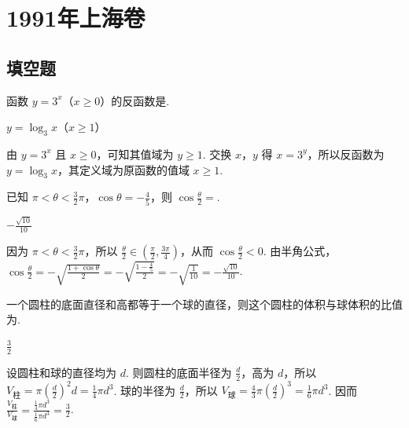 \documentclass[UTF8,a4paper,oneside,11pt]{ctexbook}
\begin{document}
\mainmatter

\chapter{1991年上海卷}
\section{填空题}

\begin{problem}
函数 \(y = 3^x\)（\(x \geqslant 0\)）的反函数是\fillinblank{}.
\end{problem}

\begin{answer}
\(y = \log_3 x\)（\(x \geqslant 1\)）
\end{answer}

\begin{solution}
由 \(y=3^x\) 且 \(x\geqslant0\)，可知其值域为 \(y\geqslant1\). 交换 \(x\)，\(y\) 得 \(x=3^y\)，所以反函数为 \(y=\log_3x\)，其定义域为原函数的值域 \(x\geqslant1\).
\end{solution}

\begin{problem}
已知 \(\pi < \theta < \frac{3}{2}\pi\)，\(\cos \theta = -\frac{4}{5}\)，则 \(\cos \frac{\theta}{2} =\)\fillinblank{}.
\end{problem}

\begin{answer}
\(-\frac{\sqrt{10}}{10}\)
\end{answer}

\begin{solution}
因为 \(\pi<\theta<\frac{3}{2}\pi\)，所以 \(\frac{\theta}{2}\in\left(\frac{\pi}{2},\frac{3\pi}{4}\right)\)，从而 \(\cos\frac{\theta}{2}<0\). 由半角公式，
\(\cos\frac{\theta}{2}=-\sqrt{\frac{1+\cos\theta}{2}}=-\sqrt{\frac{1-\frac45}{2}}=-\sqrt{\frac1{10}}=-\frac{\sqrt{10}}{10}\).
\end{solution}

\begin{problem}
一个圆柱的底面直径和高都等于一个球的直径，则这个圆柱的体积与球体积的比值为\fillinblank{}.
\end{problem}

\begin{answer}
\(\frac{3}{2}\)
\end{answer}

\begin{solution}
设圆柱和球的直径均为 \(d\). 则圆柱的底面半径为 \(\frac d2\)，高为 \(d\)，所以 \(V_{\text{柱}}=\pi\left(\frac d2\right)^2d=\frac14\pi d^3\). 球的半径为 \(\frac d2\)，所以 \(V_{\text{球}}=\frac43\pi\left(\frac d2\right)^3=\frac16\pi d^3\). 因而
\(\frac{V_{\text{柱}}}{V_{\text{球}}}=\frac{\frac14\pi d^3}{\frac16\pi d^3}=\frac32\).
\end{solution}
\end{document}
